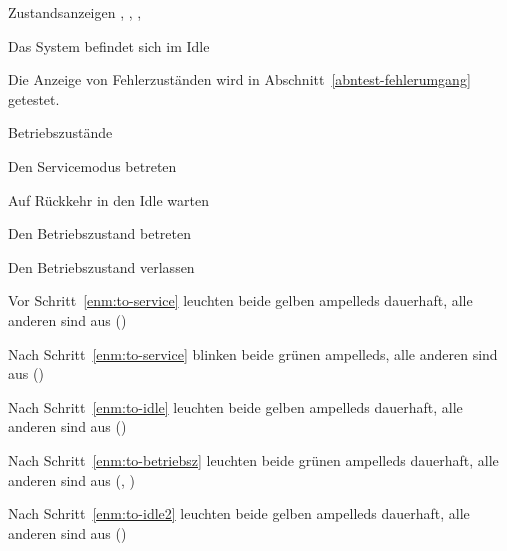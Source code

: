 \begin{abntest}{Zustandsanzeigen}{
    ,
    ,
    ,
}{
    \item Das System befindet sich im Idle
}
    \label{abntest-zustandsanzeigen}
    Die Anzeige von Fehlerzuständen wird in Abschnitt~\ref{abntest-fehlerumgang} getestet.

    \begin{ablauf}{Betriebszustände}
        \item \label{enm:to-service} Den Servicemodus betreten
        \item \label{enm:to-idle} Auf Rückkehr in den Idle warten
        \item \label{enm:to-betriebsz} Den Betriebszustand betreten
        \item \label{enm:to-idle2} Den Betriebszustand verlassen
    \end{ablauf}
    \begin{erwartung}
        \item Vor Schritt~\ref{enm:to-service} leuchten
        beide gelben \glspl{ampelled} dauerhaft, alle anderen sind aus ()
        \item Nach Schritt~\ref{enm:to-service} blinken
        beide grünen \glspl{ampelled}, alle anderen sind aus ()
        \item Nach Schritt~\ref{enm:to-idle} leuchten
        beide gelben \glspl{ampelled} dauerhaft, alle anderen sind aus ()
        \item Nach Schritt~\ref{enm:to-betriebsz} leuchten
        beide grünen \glspl{ampelled} dauerhaft, alle anderen sind aus (, )
        \item Nach Schritt~\ref{enm:to-idle2} leuchten
        beide gelben \glspl{ampelled} dauerhaft, alle anderen sind aus ()
    \end{erwartung}

\end{abntest}
